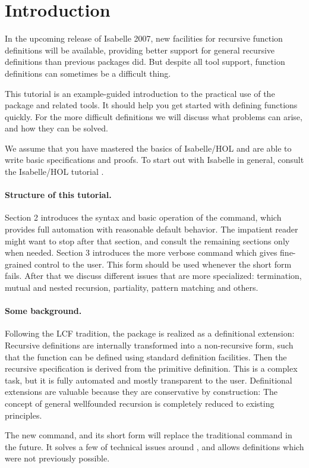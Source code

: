 \section{Introduction}

In the upcoming release of Isabelle 2007, new facilities for recursive
function definitions \cite{krauss2006} will be available, providing
better support for general recursive definitions than previous
packages did.  But despite all tool support, function definitions can
sometimes be a difficult thing. 

This tutorial is an example-guided introduction to the practical use
of the package and related tools. It should help you get started with
defining functions quickly. For the more difficult definitions we will
discuss what problems can arise, and how they can be solved.

We assume that you have mastered the basics of Isabelle/HOL
and are able to write basic specifications and proofs. To start out
with Isabelle in general, consult the Isabelle/HOL tutorial
\cite{isa-tutorial}.



\paragraph{Structure of this tutorial.}
Section 2 introduces the syntax and basic operation of the 
command, which provides full automation with reasonable default
behavior.  The impatient reader might want to stop after that
section, and consult the remaining sections only when needed.
Section 3 introduces the more verbose  command which
gives fine-grained control to the user. This form should be used
whenever the short form fails.
After that we discuss different issues that are more specialized:
termination, mutual and nested recursion, partiality, pattern matching
and others.


\paragraph{Some background.}
Following the LCF tradition, the package is realized as a definitional
extension: Recursive definitions are internally transformed into a
non-recursive form, such that the function can be defined using
standard definition facilities. Then the recursive specification is
derived from the primitive definition.  This is a complex task, but it
is fully automated and mostly transparent to the user. Definitional
extensions are valuable because they are conservative by construction:
The  concept of general wellfounded recursion is completely reduced
to existing principles.




The new  command, and its short form  will
replace the traditional  command \cite{slind-tfl} in the future. It solves
a few of technical issues around , and allows definitions
which were not previously possible.




